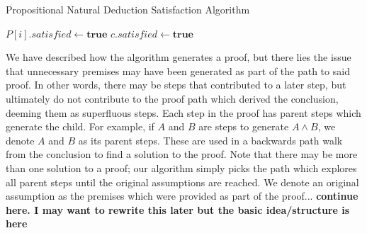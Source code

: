 \documentclass[ms]{uncgdissertationexp2}
\theoremstyle{plain}
\theoremstyle{definition}
\theoremstyle{remark}
\begin{document}
\begin{algorithm}
	\caption{Propositional Natural Deduction Satisfaction Algorithm}\label{euclid}
	\label{appendix:algorithm}
	\begin{algorithmic}[1]
		\State $P[i].satisfied\gets{\textbf{true}}$
		\EndIf
		\EndFor
		\State $c.satisfied\gets{\textbf{true}}$
		\EndIf
		\EndWhile
		\EndProcedure
	\end{algorithmic}
\end{algorithm}

We have described how the algorithm generates a proof, but there lies the issue that unnecessary premises may have been generated as part of the path to said proof. In other words, there may be steps that contributed to a later step, but ultimately do not contribute to the proof path which derived the conclusion, deeming them as superfluous steps. Each step in the proof has parent steps which generate the child. For example, if $A$ and $B$ are steps to generate $A \land B$, we denote $A$ and $B$ as its parent steps. These are used in a backwards path walk from the conclusion to find a solution to the proof. Note that there may be more than one solution to a proof; our algorithm simply picks the path which explores all parent steps until the original assumptions are reached. We denote an original assumption as the premises which were provided as part of the proof... \textbf{continue here. I may want to rewrite this later but the basic idea/structure is here}
\end{document}
